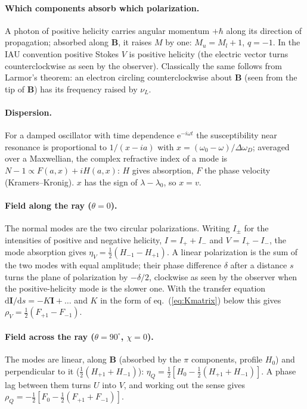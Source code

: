 \documentclass[11pt,a4paper]{article}
\newcommand{\dd}{\mathrm{d}}
\newcommand{\e}{\mathrm{e}}
\newcommand{\vI}{\boldsymbol{I}}
\begin{document}
\paragraph{Which components absorb which polarization.} A photon of
positive helicity carries angular momentum $+\hbar$ along its direction
of propagation; absorbed along $\boldsymbol B$, it raises $M$ by one:
$M_u=M_l+1$, $q=-1$. In the IAU convention positive Stokes $V$ is
positive helicity (the electric vector turns counterclockwise as seen by
the observer). Classically the same follows from Larmor's theorem: an
electron circling counterclockwise about $\boldsymbol B$ (seen from the
tip of $\boldsymbol B$) has its frequency raised by $\nu_L$.

\paragraph{Dispersion.} For a damped oscillator with time dependence
$\e^{-i\omega t}$ the susceptibility near resonance is proportional to
$1/(x-ia)$ with $x = (\omega_0-\omega)/\Delta\omega_D$; averaged over a
Maxwellian, the complex refractive index of a mode is
$N-1\propto F(a,x)+iH(a,x)$: $H$ gives absorption, $F$ the phase velocity
(Kramers--Kronig). $x$ has the sign of $\lambda-\lambda_0$, so $x=v$.

\paragraph{Field along the ray ($\theta=0$).} The normal modes are the
two circular polarizations. Writing $I_\pm$ for the intensities of
positive and negative helicity, $I = I_++I_-$ and $V = I_+-I_-$, the mode
absorption gives $\eta_V = \tfrac12(H_{-1}-H_{+1})$. A linear
polarization is the sum of the two modes with equal amplitude; their
phase difference $\delta$ after a distance $s$ turns the plane of
polarization by $-\delta/2$, clockwise as seen by the observer when the
positive-helicity mode is the slower one. With the transfer equation
$\dd\vI/\dd s = -K\vI+\ldots$ and $K$ in the form of
eq.~(\ref{eq:Kmatrix}) below this gives $\rho_V = \tfrac12(F_{+1}-F_{-1})$.

\paragraph{Field across the ray ($\theta=90^\circ$, $\chi=0$).} The
modes are linear, along $\boldsymbol B$ (absorbed by the $\pi$ components,
profile $H_0$) and perpendicular to it ($\tfrac12(H_{+1}+H_{-1})$):
$\eta_Q = \tfrac12[H_0-\tfrac12(H_{+1}+H_{-1})]$. A phase lag between
them turns $U$ into $V$, and working out the sense gives
$\rho_Q = -\tfrac12[F_0-\tfrac12(F_{+1}+F_{-1})]$.
\end{document}
